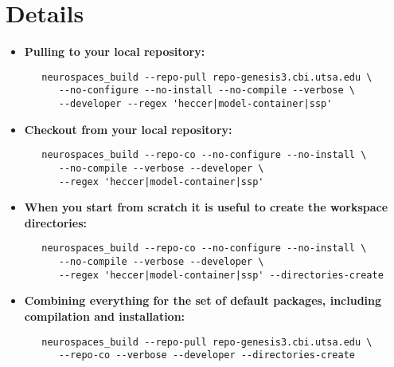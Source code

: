 \documentclass[12pt]{article}
\begin{document}
\section*{Details}

\begin{itemize}

\item {\bf Pulling to your local repository:}
\begin{verbatim}
   neurospaces_build --repo-pull repo-genesis3.cbi.utsa.edu \
      --no-configure --no-install --no-compile --verbose \
      --developer --regex 'heccer|model-container|ssp'
\end{verbatim}

\item {\bf Checkout from your local repository:}
\begin{verbatim}
   neurospaces_build --repo-co --no-configure --no-install \
      --no-compile --verbose --developer \
      --regex 'heccer|model-container|ssp'
\end{verbatim}

\item {\bf When you start from scratch it is useful to create the workspace directories:}
\begin{verbatim}
   neurospaces_build --repo-co --no-configure --no-install \
      --no-compile --verbose --developer \
      --regex 'heccer|model-container|ssp' --directories-create
\end{verbatim}

\item {\bf Combining everything for the set of default packages, including compilation and installation:}
\begin{verbatim}
   neurospaces_build --repo-pull repo-genesis3.cbi.utsa.edu \
      --repo-co --verbose --developer --directories-create
\end{verbatim}

\end{itemize}
\end{document}
